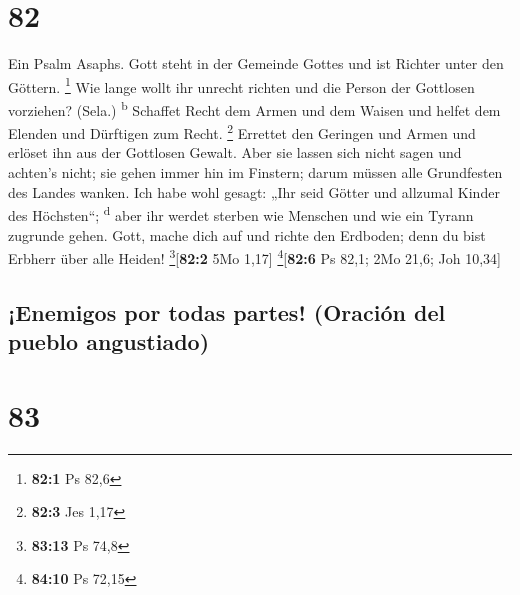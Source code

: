\hypertarget{section-81}{%
\section{82}\label{section-81}}

 Ein Psalm Asaphs. Gott steht in der Gemeinde Gottes und
ist Richter unter den Göttern. \footnote{\textbf{82:1} Ps 82,6}
 Wie lange wollt ihr unrecht richten und die Person der
Gottlosen vorziehen? (Sela.) \textsuperscript{b}  Schaffet
Recht dem Armen und dem Waisen und helfet dem Elenden und Dürftigen zum
Recht. \footnote{\textbf{82:3} Jes 1,17}  Errettet den
Geringen und Armen und erlöset ihn aus der Gottlosen Gewalt.
 Aber sie lassen sich nicht sagen und achten's nicht; sie
gehen immer hin im Finstern; darum müssen alle Grundfesten des Landes
wanken.  Ich habe wohl gesagt: „Ihr seid Götter und
allzumal Kinder des Höchsten``; \textsuperscript{d}  aber
ihr werdet sterben wie Menschen und wie ein Tyrann zugrunde gehen.
 Gott, mache dich auf und richte den Erdboden; denn du
bist Erbherr über alle Heiden! \footnote{\textbf{83:13} Ps 74,8}{[}\textbf{82:2}
5Mo 1,17{]} \footnote{\textbf{84:10} Ps 72,15}{[}\textbf{82:6} Ps 82,1;
2Mo 21,6; Joh 10,34{]}

\hypertarget{enemigos-por-todas-partes-oraciuxf3n-del-pueblo-angustiado}{%
\subsection{¡Enemigos por todas partes! (Oración del pueblo
angustiado)}\label{enemigos-por-todas-partes-oraciuxf3n-del-pueblo-angustiado}}

\hypertarget{section-82}{%
\section{83}\label{section-82}}

